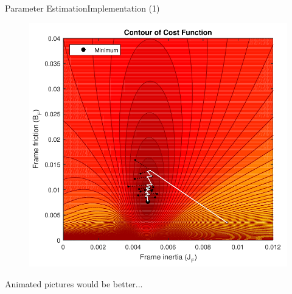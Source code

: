 \begin{frame}{Parameter Estimation}{Implementation (1)}
  \begin{minipage}{\linewidth}\centering
    \begin{minipage}{0.35\linewidth}
      \begin{figure}[H]
        \centering
                
      \end{figure}
    \end{minipage}
    \hspace{0.15\linewidth}
    \begin{minipage}{0.45\linewidth}
      \begin{figure}[H]
        \centering
        \includegraphics[scale=0.35]{Pictures/costFunctionMinimizedContour.pdf}
      \end{figure}
    \end{minipage}
  \end{minipage}
  Animated pictures would be better...
\end{frame}

